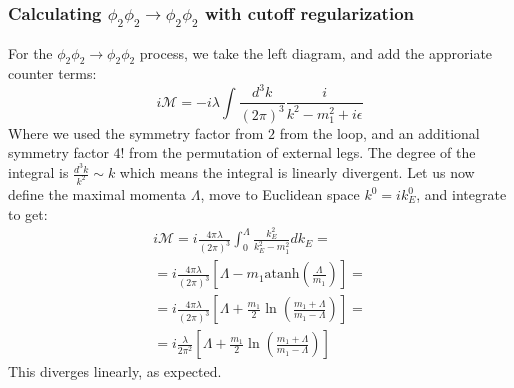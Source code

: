 \documentclass{article}
\begin{document}
\subsubsection{Calculating $\phi_2\phi_2 \rightarrow \phi_2\phi_2$ with cutoff regularization}
For the $\phi_2\phi_2 \rightarrow \phi_2\phi_2$ process, we take the left diagram, and add the approriate counter terms:
\begin{equation}
    i\mathcal{M} = -i\lambda \int \frac{d^3k}{(2\pi)^3} \frac{i}{k^2 - m_1^2 + i\epsilon}
\end{equation}
Where we used the symmetry factor from $2$ from the loop, and an additional symmetry factor $4!$ from the permutation of external legs.
\newline
The degree of the integral is $\frac{d^3k}{k^2} \sim k$ which means the integral is linearly divergent.
\newline
Let us now define the maximal momenta $\Lambda$, move to Euclidean space $k^0 = ik_E^0$, and integrate to get:
\begin{equation}
\begin{gathered}
    i\mathcal{M} = i\frac{4\pi \lambda}{(2\pi)^3} \int_0^\Lambda \frac{k_E^2}{k_E^2 - m_1^2}dk_E = \\ =
    i\frac{4\pi \lambda}{(2\pi)^3} \left[\Lambda - m_1\text{atanh}\left(\frac{\Lambda}{m_1}\right)\right] = \\ =
    i\frac{4\pi \lambda}{(2\pi)^3} \left[\Lambda + \frac{m_1}{2}\ln(\frac{m_1 + \Lambda}{m_1 - \Lambda})\right] = \\ =
    i\frac{\lambda}{2\pi^2} \left[\Lambda + \frac{m_1}{2}\ln(\frac{m_1 + \Lambda}{m_1 - \Lambda})\right]
\end{gathered}
\end{equation}
This diverges linearly, as expected.
\end{document}

